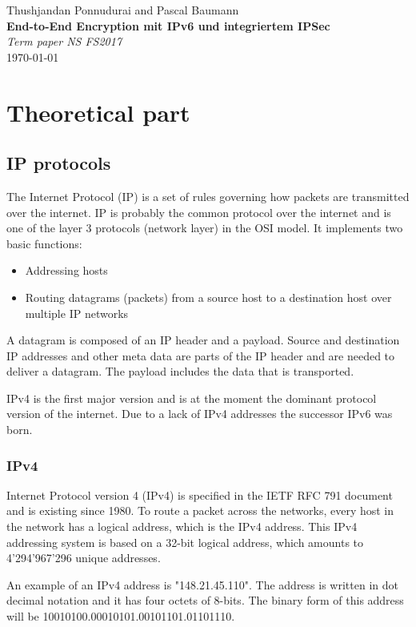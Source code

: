 \documentclass[a4paper]{report}
\newcommand*{\titleAP}{\begingroup %
	\centering
	\vspace*{\baselineskip} %
	
	{\Large Thushjandan Ponnudurai} and {\Large Pascal Baumann}\\[0.167\textheight] %
	
	{\Huge\bfseries End-to-End Encryption mit IPv6 und integriertem IPSec}\\[\baselineskip]
	
	{\Large \textit{Term paper NS FS2017}}\\
	\today
	
	\vspace*{3\baselineskip} %
	\endgroup}
\begin{document}
\titleAP

\newpage

\begin{abstract}
	\blindtext
\end{abstract}

\tableofcontents

\newpage

\chapter{Theoretical part}
\label{ch:Theory}

\section{IP protocols}
\label{sec:IPprot}
The Internet Protocol (IP) is a set of rules governing how packets are transmitted over the internet. IP is probably the common protocol over the internet and is one of the layer 3 protocols (network layer) in the OSI model. It implements two basic functions:
\begin{itemize}
	\item Addressing hosts
	\item Routing datagrams (packets) from a source host to a destination host over multiple IP networks
\end{itemize}
A datagram is composed of an IP header and a payload. Source and destination IP addresses and other meta data are parts of the IP header and are needed to deliver a datagram. The payload includes the data that is transported.

IPv4 is the first major version and is at the moment the dominant protocol version of the internet. Due to a lack of IPv4 addresses the successor IPv6 was born. \parencite{NadeemUnuth2016}

\subsection{IPv4}
\label{ssec:IPv4}
Internet Protocol version 4 (IPv4) is specified in the IETF RFC 791 document and is existing since 1980. To route a packet across the networks, every host in the network has a logical address, which is the IPv4 address. This IPv4 addressing system is based on a 32-bit logical address, which amounts to 4'294'967'296 unique addresses.

An example of an IPv4 address is "148.21.45.110". The address is written in dot decimal notation and it has four octets of 8-bits. The binary form of this address will be 10010100.00010101.00101101.01101110. \parencite{Babatunde2014}
\end{document}

